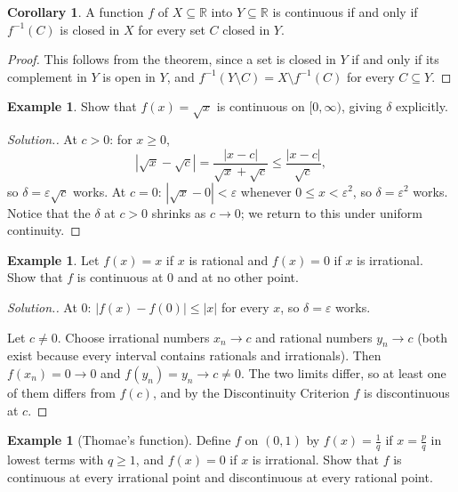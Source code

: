 \documentclass[11pt,a4paper]{article}
\numberwithin{equation}{section}
\theoremstyle{definition}
\newtheorem{exa}[thm]{Example}
\newtheorem{coro}[thm]{Corollary}
\newenvironment{solution}
  {\renewcommand{\qedsymbol}{}\begin{proof}[\textit{Solution}.]}
  {\end{proof}}
\begin{document}
\begin{coro}
A function $f$ of $X\subseteq \mathbb{R}$ into $Y\subseteq \mathbb{R}$ is continuous if and only if $f^{-1}(C)$ is closed in $X$ for every set $C$ closed in $Y$.
\end{coro}

\begin{proof}
This follows from the theorem, since a set is closed in $Y$ if and only if its complement in $Y$ is open in $Y$, and $f^{-1}(Y\setminus C) = X\setminus f^{-1}(C)$ for every $C\subseteq Y$.
\end{proof}

\begin{exa}
Show that $f(x) = \sqrt{x}$ is continuous on $[0,\infty)$, giving $\delta$ explicitly.
\end{exa}

\begin{solution}
At $c>0$: for $x\geq0$,
$$|\sqrt{x} - \sqrt{c}| = \frac{|x-c|}{\sqrt{x}+\sqrt{c}}\leq\frac{|x-c|}{\sqrt{c}},$$
so $\delta = \varepsilon\sqrt{c}$ works. At $c = 0$: $|\sqrt{x}-0|<\varepsilon$ whenever $0\leq x<\varepsilon^2$, so $\delta = \varepsilon^2$ works. Notice that the $\delta$ at $c>0$ shrinks as $c\longrightarrow 0$; we return to this under uniform continuity.
\end{solution}

\begin{exa}
Let $f(x) = x$ if $x$ is rational and $f(x) = 0$ if $x$ is irrational. Show that $f$ is continuous at $0$ and at no other point.
\end{exa}

\begin{solution}
At $0$: $|f(x) - f(0)|\leq|x|$ for every $x$, so $\delta = \varepsilon$ works.

Let $c\neq 0$. Choose irrational numbers $x_n\longrightarrow c$ and rational numbers $y_n\longrightarrow c$ (both exist because every interval contains rationals and irrationals). Then $f(x_n) = 0\longrightarrow 0$ and $f(y_n) = y_n\longrightarrow c\neq0$. The two limits differ, so at least one of them differs from $f(c)$, and by the Discontinuity Criterion $f$ is discontinuous at $c$.
\end{solution}

\begin{exa}[Thomae's function]
Define $f$ on $(0,1)$ by $f(x) = \frac{1}{q}$ if $x = \frac{p}{q}$ in lowest terms with $q\geq 1$, and $f(x) = 0$ if $x$ is irrational. Show that $f$ is continuous at every irrational point and discontinuous at every rational point.
\end{exa}
\end{document}

